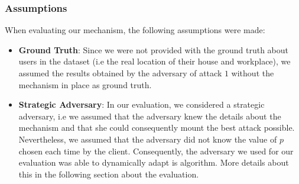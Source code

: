 \documentclass[10pt,conference,compsocconf]{IEEEtran}
\begin{document}
\subsubsection{Assumptions}
When evaluating our mechanism, the following assumptions were made:
\begin{itemize}
    \item \textbf{Ground Truth}: Since we were not provided with the ground
    truth about users in the dataset (i.e the real location of their house and
    workplace), we assumed the results obtained by the adversary of attack $1$
    without the mechanism in place as ground truth.
    \item \textbf{Strategic Adversary}: In our evaluation, we considered a
    strategic adversary, i.e we assumed that the adversary knew the details
    about the mechanism and that she could consequently mount the best attack
    possible. Nevertheless, we assumed that the adversary did not know the value
    of $p$ chosen each time by the client.\newline
    Consequently, the adversary we used for our evaluation was able to
    dynamically adapt is algorithm. More details about this in the following
    section about the evaluation.
\end{itemize}
\end{document}
